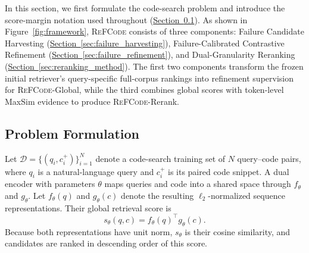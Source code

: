 \documentclass[11pt]{article}
\newcommand{\method}{\textsc{ReFCode}}
\begin{document}
In this section, we first formulate the code-search problem and introduce the score-margin notation used throughout (\hyperref[sec:problem_formulation]{Section~\ref*{sec:problem_formulation}}). As shown in Figure~\ref{fig:framework}, \method{} consists of three components: Failure Candidate Harvesting (\hyperref[sec:failure_harvesting]{Section~\ref*{sec:failure_harvesting}}), Failure-Calibrated Contrastive Refinement (\hyperref[sec:failure_refinement]{Section~\ref*{sec:failure_refinement}}), and Dual-Granularity Reranking (\hyperref[sec:reranking_method]{Section~\ref*{sec:reranking_method}}). The first two components transform the frozen initial retriever's query-specific full-corpus rankings into refinement supervision for \method{}-Global, while the third combines global scores with token-level MaxSim evidence to produce \method{}-Rerank.

\subsection{Problem Formulation}
\label{sec:problem_formulation}

Let \(\mathcal{D}=\{(q_i,c_i^+)\}_{i=1}^{N}\) denote a code-search training set of \(N\) query--code pairs, where \(q_i\) is a natural-language query and \(c_i^+\) is its paired code snippet. A dual encoder with parameters \(\theta\) maps queries and code into a shared space through \(f_\theta\) and \(g_\theta\). Let \(f_\theta(q)\) and \(g_\theta(c)\) denote the resulting \(\ell_2\)-normalized sequence representations. Their global retrieval score is
\begin{equation}
  s_\theta(q,c)=f_\theta(q)^{\top}g_\theta(c).
  \label{eq:global_score}
\end{equation}
Because both representations have unit norm, \(s_\theta\) is their cosine similarity, and candidates are ranked in descending order of this score.
\end{document}
